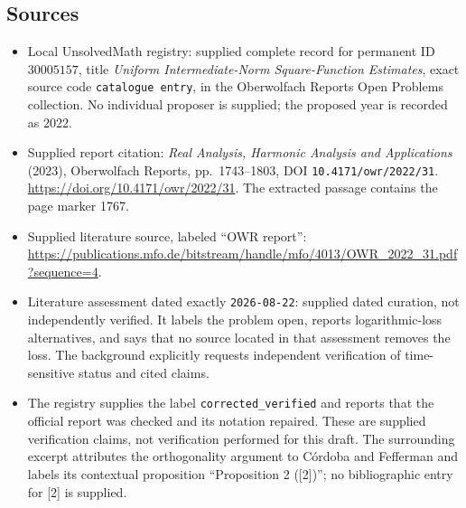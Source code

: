 \documentclass[11pt]{article}
\begin{document}
\subsection{Sources}
\begin{itemize}
\item Local UnsolvedMath registry: supplied complete record for permanent ID \(30005157\), title \emph{Uniform Intermediate-Norm Square-Function Estimates}, exact source code \texttt{catalogue entry}, in the Oberwolfach Reports Open Problems collection. No individual proposer is supplied; the proposed year is recorded as 2022.
\item Supplied report citation: \emph{Real Analysis, Harmonic Analysis and Applications} (2023), Oberwolfach Reports, pp.\ 1743--1803, DOI \texttt{10.4171/owr/2022/31}. \url{https://doi.org/10.4171/owr/2022/31}. The extracted passage contains the page marker 1767.
\item Supplied literature source, labeled ``OWR report'': \url{https://publications.mfo.de/bitstream/handle/mfo/4013/OWR_2022_31.pdf?sequence=4}.
\item Literature assessment dated exactly \texttt{2026-08-22}: supplied dated curation, not independently verified. It labels the problem open, reports logarithmic-loss alternatives, and says that no source located in that assessment removes the loss. The background explicitly requests independent verification of time-sensitive status and cited claims.
\item The registry supplies the label \texttt{corrected\_verified} and reports that the official report was checked and its notation repaired. These are supplied verification claims, not verification performed for this draft. The surrounding excerpt attributes the orthogonality argument to C\'ordoba and Fefferman and labels its contextual proposition ``Proposition 2 ([2])''; no bibliographic entry for [2] is supplied.
\end{itemize}
\end{document}
